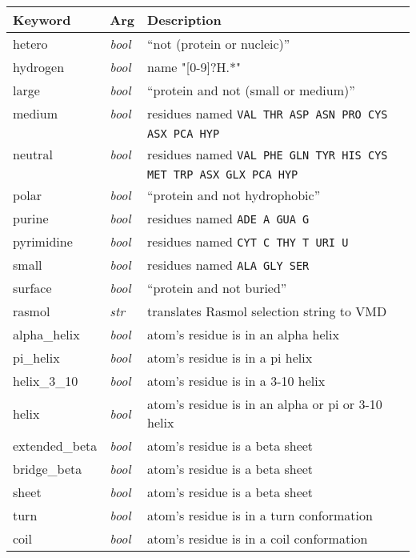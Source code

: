 \newpage
\begin{table}[htb]
\hspace{0.5in}
\begin{tabular}{|p{.9 in}| p{.4 in}| p{4.8in}| } 
\hline
Keyword & Arg & Description \\ 
\hline \hline
hetero         & {\it bool}  & ``not (protein or nucleic)'' \\
hydrogen       & {\it bool}  & name "[0-9]?H.*" \\
large          & {\it bool}  & ``protein and not (small or medium)'' \\
medium         & {\it bool}  & residues named {\tt VAL THR ASP ASN PRO CYS} \\
               &             & {\tt ASX PCA HYP} \\
neutral        & {\it bool}  & residues named {\tt VAL PHE GLN TYR HIS CYS} \\
               &             & {\tt MET TRP ASX GLX PCA HYP} \\
polar          & {\it bool}  & ``protein and not hydrophobic'' \\
purine         & {\it bool}  & residues named {\tt ADE A GUA G} \\
pyrimidine     & {\it bool}  & residues named {\tt CYT C THY T URI U} \\
small          & {\it bool}  & residues named {\tt ALA GLY SER} \\
surface        & {\it bool}  & ``protein and not buried'' \\
rasmol         & {\it str}   & translates Rasmol selection string to VMD \\
alpha\_helix   & {\it bool}  & atom's residue is in an alpha helix  \\
pi\_helix      & {\it bool}  & atom's residue is in a pi helix   \\
helix\_3\_10   & {\it bool}  & atom's residue is in a 3-10 helix \\
helix          & {\it bool}  & atom's residue is in an alpha or pi or 3-10 helix \\
extended\_beta & {\it bool}  & atom's residue is a beta sheet \\
bridge\_beta   & {\it bool}  & atom's residue is a beta sheet \\
sheet          & {\it bool}  & atom's residue is a beta sheet \\
turn           & {\it bool}  & atom's residue is in a turn conformation \\
coil           & {\it bool}  & atom's residue is in a coil conformation  \\

\end{tabular}
\end{table}
